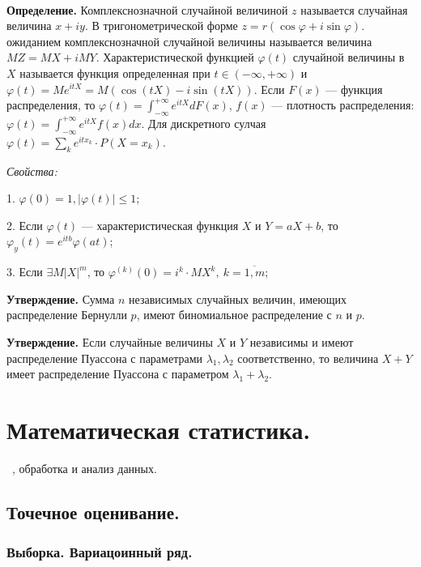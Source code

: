 \documentclass[9pt]{article}
\begin{document}
\ 
\par\textbf{Определение.} Комплекснозначной случайной величиной \(z\) называется случайная величина \(x+iy\). В тригонометрической форме \(z=r(\cos\varphi + i\sin\varphi)\).
\parМатематическим ожиданием комплекснозначной случайной величины называется величина \(MZ=MX+iMY\). Характеристической функцией \(\varphi(t)\) случайной величины в \(X\) называется функция определенная при \(t\in(-\infty,+\infty)\) и \(\varphi(t)=Me^{itX}=M(\cos(tX)-i\sin(tX))\). Если \(F(x)\) --- функция распределения, то \(\varphi(t)=\int_{-\infty}^{+\infty}e^{itX}dF(x)\), \(f(x)\) --- плотность распределения: \(\varphi(t)=\int_{-\infty}^{+\infty}e^{itX}f(x)dx\). Для дискретного сулчая \(\varphi(t)=\displaystyle\sum_ke^{itx_k}\cdot P(X=x_k)\).
\par\textit{Свойства:}
\par1. \(\varphi(0)=1,|\varphi(t)|\le1\);
\par2. Если \(\varphi(t)\) --- характеристическая функция \(X\) и \(Y=aX+b\), то \(\varphi_y(t)=e^{itb}\varphi(at)\);
\par3. Если \(\exists M|X|^m\), то \(\varphi^{(k)}(0)=i^k\cdot MX^k,\ k=\overline{1,m}\);
\par\textbf{Утверждение.} Сумма $n$ независимых случайных величин, имеющих распределение Бернулли $p$, имеют биномиальное распределение с \(n\) и \(p\).
\par\textbf{Утверждение.} Если случайные величины \(X\) и \(Y\) независимы и имеют распределение Пуассона с параметрами \(\lambda_1,\lambda_2\) соответственно, то величина \(X+Y\) имеет распределение Пуассона с параметром \(\lambda_1+\lambda_2\).

\section{Математическая статистика.}

\ 
, обработка и анализ данных.

\subsection{Точечное оценивание.}

\subsubsection{Выборка. Вариацоинный ряд.}
\end{document}
